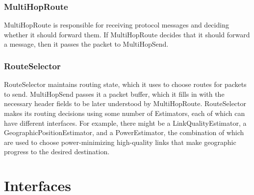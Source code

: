 \documentclass[10pt]{article}
\begin{document}
\subsubsection*{MultiHopRoute}

MultiHopRoute is responsible for receiving protocol messages and
deciding whether it should forward them. If MultiHopRoute decides that
it should forward a message, then it passes the packet to MultiHopSend.

\subsubsection*{RouteSelector}

RouteSelector maintains routing state, which it uses to choose routes
for packets to send. MultiHopSend passes it a packet buffer, which it
fills in with the necessary header fields to be later understood by
MultiHopRoute. RouteSelector makes its routing decisions using some
number of Estimators, each of which can have different interfaces. For
example, there might be a LinkQualityEstimator, a
GeographicPositionEstimator, and a PowerEstimator, the combination of
which are used to choose power-minimizing high-quality links that make
geographic progress to the desired destination.


\section*{Interfaces}
\end{document}
